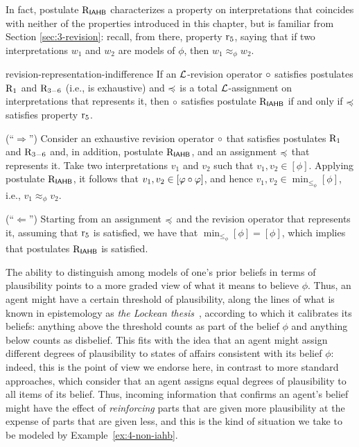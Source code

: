 In fact, postulate $\mathrm{R}_{\mathsf{IAHB}}$ characterizes a property on interpretations
that coincides with neither of the properties introduced in this chapter,
but is familiar from Section \ref{sec:3-revision}:
recall, from there, property $\mathrm{r}_{5}$, saying that if two interpretations $w_1$ and $w_2$ 
are models of $\phi$, then $w_1\approx_\phi w_2$.

\begin{thm}{}{revision-representation-indifference}
	If an $\mathcal{L}$-revision operator $\circ$ 
	satisfies postulates $\mathrm{R}_{1}$ and $\mathrm{R}_{3-6}$
	(i.e., is exhaustive)
	and $\preccurlyeq$ is a total $\mathcal{L}$-assignment on interpretations
	that represents it,
	then
	$\circ$ satisfies postulate $\mathrm{R}_{\mathsf{IAHB}}$ if and only if 
	$\preccurlyeq$ satisfies property $\mathrm{r}_{5}$.
\end{thm}
\begin{prf*}{}{}%
	(``$\Rightarrow$'')
	Consider an exhaustive revision operator $\circ$ that satisfies postulates $\mathrm{R}_{1}$ and $\mathrm{R}_{3-6}$
	and, in addition, postulate $\mathrm{R}_{\mathsf{IAHB}}$, 
	and an assignment $\preccurlyeq$ that represents it.
	Take two interpretations $v_1$ and $v_2$ such that $v_1,v_2\in[\phi]$. 
	Applying postulate $\mathrm{R}_{\mathsf{IAHB}}$, it follows that $v_1,v_2\in[\varphi\circ\varphi]$,
	and hence $v_1,v_2\in\min_{\le_\phi}[\phi]$, i.e., $v_1\approx_\phi v_2$.

	(``$\Leftarrow$'')
	Starting from an assignment $\preccurlyeq$ and the revision operator that represents it,
	assuming that $\mathrm{r}_{5}$ is satisfied, we have that $\min_{\le_\phi}[\phi] = [\phi]$,
	which implies that postulates $\mathrm{R}_{\mathsf{IAHB}}$ is satisfied.
\end{prf*}

The ability to distinguish among models of one's prior beliefs
in terms of plausibility
points to a more graded view of what it means
to believe $\phi$. Thus, an agent might have a certain threshold of plausibility,
along the lines of what is known in epistemology
as \emph{the Lockean thesis}~\cite{Foley93},
according to which it calibrates its beliefs: 
anything above the threshold counts as part of the belief $\phi$
and anything below counts as disbelief.
This fits with the idea that an agent
might assign different degrees of plausibility to states of affairs
consistent with its belief $\phi$:
indeed, this is the point of view we endorse here,
in contrast to more standard approaches, which consider
that an agent assigns equal 
degrees of plausibility to all items of its belief.
Thus, incoming information that confirms an agent's belief might have the effect
of \emph{reinforcing} parts that are given more plausibility
at the expense of parts that are given less,
and this is the kind of situation we take to be
modeled by Example~\ref{ex:4-non-iahb}.

